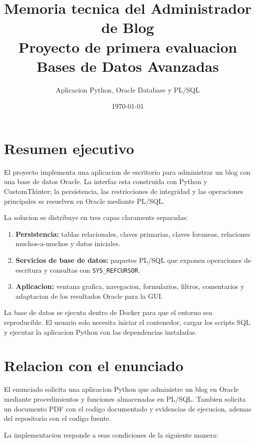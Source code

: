 \documentclass[12pt,a4paper]{article}
\title{\textbf{Memoria tecnica del Administrador de Blog}\\
\large Proyecto de primera evaluacion\\
\normalsize Bases de Datos Avanzadas}
\author{Aplicacion Python, Oracle Database y PL/SQL}
\date{\today}
\begin{document}
\maketitle
\tableofcontents
\newpage

\section{Resumen ejecutivo}

El proyecto implementa una aplicacion de escritorio para administrar un blog
con una base de datos Oracle. La interfaz esta construida con Python y
CustomTkinter; la persistencia, las restricciones de integridad y las
operaciones principales se resuelven en Oracle mediante PL/SQL.

La solucion se distribuye en tres capas claramente separadas:

\begin{enumerate}
    \item \textbf{Persistencia:} tablas relacionales, claves primarias,
    claves foraneas, relaciones muchos-a-muchos y datos iniciales.
    \item \textbf{Servicios de base de datos:} paquetes PL/SQL que exponen
    operaciones de escritura y consultas con \texttt{SYS\_REFCURSOR}.
    \item \textbf{Aplicacion:} ventana grafica, navegacion, formularios,
    filtros, comentarios y adaptacion de los resultados Oracle para la GUI.
\end{enumerate}

La base de datos se ejecuta dentro de Docker para que el entorno sea
reproducible. El usuario solo necesita iniciar el contenedor, cargar los
scripts SQL y ejecutar la aplicacion Python con las dependencias instaladas.

\section{Relacion con el enunciado}

El enunciado solicita una aplicacion Python que administre un blog en Oracle
mediante procedimientos y funciones almacenadas en PL/SQL. Tambien solicita
un documento PDF con el codigo documentado y evidencias de ejecucion, ademas
del repositorio con el codigo fuente.

La implementacion responde a esas condiciones de la siguiente manera:
\end{document}
